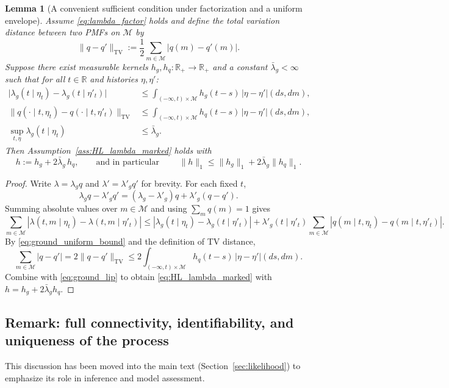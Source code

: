 \documentclass[12pt]{article}
\newtheorem{lemma}[theorem]{Lemma}
\begin{document}
\begin{lemma}[A convenient sufficient condition under factorization and a uniform envelope]
\label{lem:HL_from_ground_and_mark}
Assume \eqref{eq:lambda_factor} holds and define the total variation distance between two PMFs on $\mathcal M$ by
\[
\|q-q'\|_{\mathrm{TV}} := \frac12\sum_{m\in\mathcal M}|q(m)-q'(m)|.
\]
Suppose there exist measurable kernels $h_g,h_q:\mathbb R_+\to\mathbb R_+$ and a constant $\bar\lambda_g<\infty$ such that for all $t\in\mathbb R$ and histories $\eta,\eta'$:
\begin{align}
\label{eq:ground_lip}
\bigl|\lambda_g(t\mid \eta_t)-\lambda_g(t\mid \eta'_t)\bigr|
&\le
\int_{(-\infty,t)\times\mathcal M} h_g(t-s)\,|\eta-\eta'|(ds,dm),\\
\label{eq:mark_tv_lip}
\|q(\cdot\mid t,\eta_t)-q(\cdot\mid t,\eta'_t)\|_{\mathrm{TV}}
&\le
\int_{(-\infty,t)\times\mathcal M} h_q(t-s)\,|\eta-\eta'|(ds,dm),\\
\label{eq:ground_uniform_bound}
\sup_{t,\eta}\lambda_g(t\mid \eta_t) &\le \bar\lambda_g.
\end{align}
Then Assumption~\ref{ass:HL_lambda_marked} holds with
\[
h := h_g + 2\bar\lambda_g\,h_q,
\qquad\text{and in particular }\qquad
\|h\|_1 \le \|h_g\|_1 + 2\bar\lambda_g\|h_q\|_1.
\]
\end{lemma}

\begin{proof}
Write $\lambda=\lambda_g q$ and $\lambda'=\lambda'_g q'$ for brevity.
For each fixed $t$,
\[
\lambda_g q-\lambda'_g q' = (\lambda_g-\lambda'_g)q + \lambda'_g(q-q').
\]
Summing absolute values over $m\in\mathcal M$ and using $\sum_m q(m)=1$ gives
\[
\sum_{m\in\mathcal M}|\lambda(t,m\mid\eta_t)-\lambda(t,m\mid\eta'_t)|
\le
|\lambda_g(t\mid\eta_t)-\lambda_g(t\mid\eta'_t)|
+
\lambda'_g(t\mid\eta'_t)\sum_{m\in\mathcal M}|q(m\mid t,\eta_t)-q(m\mid t,\eta'_t)|.
\]
By \eqref{eq:ground_uniform_bound} and the definition of TV distance,
\[
\sum_{m\in\mathcal M}|q-q'| = 2\|q-q'\|_{\mathrm{TV}}
\le
2\int_{(-\infty,t)\times\mathcal M} h_q(t-s)\,|\eta-\eta'|(ds,dm).
\]
Combine with \eqref{eq:ground_lip} to obtain \eqref{eq:HL_lambda_marked} with $h=h_g+2\bar\lambda_g h_q$.
\end{proof}

\subsection{Remark: full connectivity, identifiability, and uniqueness of the process}

This discussion has been moved into the main text (Section~\ref{sec:likelihood}) to emphasize its role in inference and model assessment.
\end{document}
